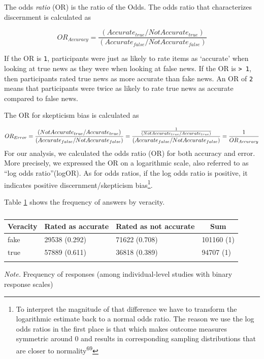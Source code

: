 \documentclass[
  man]{apa6}
\begin{document}
The odds \emph{ratio} (OR) is the ratio of the Odds. The odds ratio that characterizes discernment is calculated as

\[
OR_{Accuracy} = \frac{(Accurate_{true}/ NotAccurate_{true})}{(Accurate_{false}/ NotAccurate_{false})}
\]

If the OR is \texttt{1}, participants were just as likely to rate items as `accurate' when looking at true news as they were when looking at false news. If the OR is \texttt{\textgreater{}\ 1}, then participants rated true news as more accurate than fake news. An OR of \texttt{2} means that participants were twice as likely to rate true news as accurate compared to false news.

The OR for skepticism bias is calculated as

\[
OR_{Error} = \frac{(NotAccurate_{true}/Accurate_{true})}{(Accurate_{false}/NotAccurate_{false})} \leavevmode \newline
= \frac{\frac{1}{(NotAccurate_{true}/Accurate_{true})}}{(Accurate_{false}/NotAccurate_{false})} \leavevmode \newline
= \frac{1}{OR_{Accuracy}}
\]
For our analysis, we calculated the odds ratio (OR) for both accuracy and error. More precisely, we expressed the OR on a logarithmic scale, also referred to as ``log odds ratio''(logOR). As for odds ratios, if the log odds ratio is positive, it indicates positive discernment/skepticism bias\footnote{To interpret the magnitude of that difference we have to transform the logarithmic estimate back to a normal odds ratio. The reason we use the log odds ratios in the first place is that which makes outcome measures symmetric around 0 and results in corresponding sampling distributions that are closer to normality\textsuperscript{69}}.

Table \ref{tab:frequency} shows the frequency of answers by veracity.

\begin{table}[tbp]

\begin{center}
\begin{threeparttable}

\caption{\label{tab:frequency}}

\begin{tabular}{llll}
\toprule
Veracity & \multicolumn{1}{c}{Rated as accurate} & \multicolumn{1}{c}{Rated as not accurate} & \multicolumn{1}{c}{Sum}\\
\midrule
fake & 29538 (0.292) & 71622 (0.708) & 101160 (1)\\
true & 57889 (0.611) & 36818 (0.389) & 94707 (1)\\
\bottomrule
\addlinespace
\end{tabular}

\begin{tablenotes}[para]
\normalsize{\textit{Note.} Frequency of responses (among individual-level studies with binary response scales)}
\end{tablenotes}

\end{threeparttable}
\end{center}

\end{table}
\end{document}

